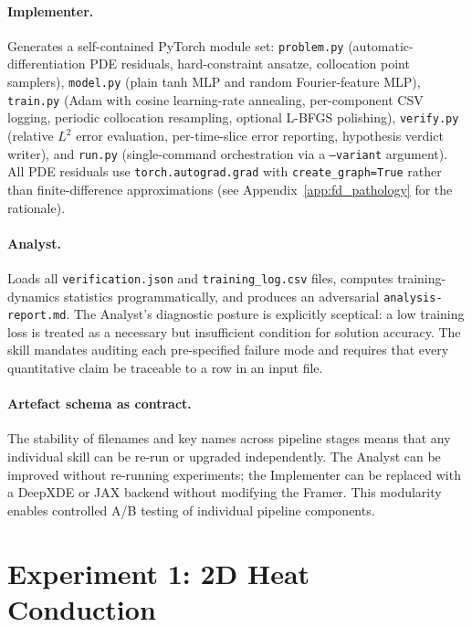 \documentclass{article}
\begin{document}
\paragraph{Implementer.}
Generates a self-contained PyTorch module set: \texttt{problem.py}
(automatic-differentiation PDE residuals, hard-constraint ansatze,
collocation point samplers), \texttt{model.py} (plain tanh MLP and
random Fourier-feature MLP), \texttt{train.py} (Adam with cosine learning-rate
annealing, per-component CSV logging, periodic collocation resampling, optional
L-BFGS polishing), \texttt{verify.py} (relative $L^2$ error evaluation,
per-time-slice error reporting, hypothesis verdict writer), and \texttt{run.py}
(single-command orchestration via a \texttt{--variant} argument).
All PDE residuals use \texttt{torch.autograd.grad} with
\texttt{create\_graph=True} rather than finite-difference approximations
(see Appendix~\ref{app:fd_pathology} for the rationale).

\paragraph{Analyst.}
Loads all \texttt{verification.json} and \texttt{training\_log.csv} files,
computes training-dynamics statistics programmatically, and produces an
adversarial \texttt{analysis-report.md}.
The Analyst's diagnostic posture is explicitly sceptical: a low training loss
is treated as a necessary but insufficient condition for solution accuracy.
The skill mandates auditing each pre-specified failure mode and requires
that every quantitative claim be traceable to a row in an input file.

\paragraph{Artefact schema as contract.}
The stability of filenames and key names across pipeline stages means that
any individual skill can be re-run or upgraded independently.
The Analyst can be improved without re-running experiments; the Implementer
can be replaced with a DeepXDE or JAX backend without modifying the Framer.
This modularity enables controlled A/B testing of individual pipeline
components.

\section{Experiment 1: 2D Heat Conduction}
\label{sec:heat}
\end{document}
